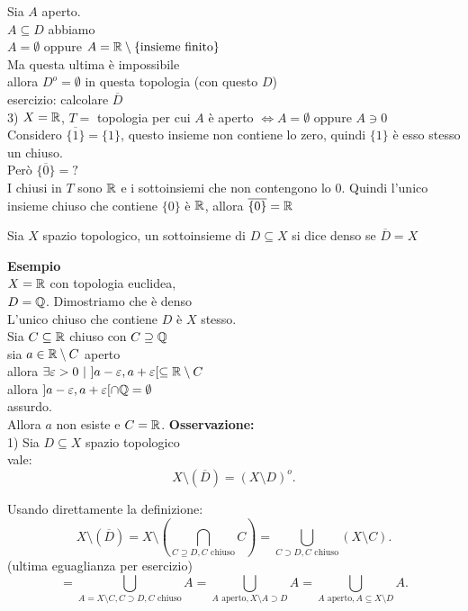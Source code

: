 \documentclass[12px]{article}
\begin{document}
	  Sia  $A$ aperto.\\
	  $A\subseteq D$ abbiamo\\
	  $A = \emptyset $ oppure $A = \mathbb{R}\setminus\{\text{insieme finito}\}$\\
	  Ma questa ultima è impossibile\\
	  allora  $D^o = \emptyset$ in questa topologia (con questo $D$)\\
	  esercizio: calcolare $\overline D$\\
	  3)  $X = \mathbb{R}$, $T = $ topologia per cui $A$ è aperto $ \Leftrightarrow A = \emptyset$ oppure $A\ni 0$ \\
	  Considero $\overline{\{1\}} = \{1\}$, questo insieme non contiene lo zero, quindi $\{1\}$ è esso stesso un chiuso.\\
	  Però $\overline{\{0\}} = ?$ \\
	  I chiusi in  $T$ sono $\mathbb{R}$ e i sottoinsiemi che non contengono lo  $0$. Quindi l'unico insieme chiuso che contiene $\{0\}$ è $\mathbb{R}$, allora $\overline{\{0\}} = \mathbb{R}$
	   \begin{defi}
	  	Sia $X$ spazio topologico, un sottoinsieme di $D\subseteq X$ si dice denso se $\overline D = X$
	  \end{defi}
	  \textbf{Esempio}\\
	  $X = \mathbb{R} $ con topologia euclidea,\\
	  $D = \mathbb{Q}$. Dimostriamo che è denso\\
	  L'unico chiuso che contiene  $D$ è $X$ stesso.\\
	   Sia $C\subseteq \mathbb{R}$ chiuso con  $C\supseteq \mathbb{Q}$\\
	   sia $a\in\mathbb{R}\setminus C$ aperto\\
	   allora  $\exists \varepsilon > 0 \ | \ ]a - \varepsilon, a + \varepsilon[ \subseteq \mathbb{R}\setminus C$ \\
	   allora $] a - \varepsilon, a + \varepsilon[\cap \mathbb{Q} = \emptyset$ \\
	   assurdo.\\
	   Allora $a$ non esiste e $C = \mathbb{R}$. 
	   \textbf{Osservazione:}\\
	   1) Sia  $D\subseteq X$ spazio topologico\\
	   vale:\\
	    \[
	   X\setminus(\overline D) = (X\setminus D)^o
	   .\] 
	   \begin{dimo}
	   	Usando direttamente la definizione:\\
		\[
			X\setminus(\overline D) = X\setminus (\bigcap_{C\supseteq D, C \text { chiuso}}C) = \bigcup_{C\supset D, C \text { chiuso}}(X\setminus C) 
		.\] 
		(ultima eguaglianza per esercizio)
		\[
			= \bigcup_{A = X\setminus C, C\supset D, C\text{ chiuso}}A = \bigcup_{A\text{ aperto}, X\setminus A\supset D} A= \bigcup_{A\text{ aperto}, A\subseteq X\setminus D}A
		.\] 
	   \end{dimo}
\end{document}
